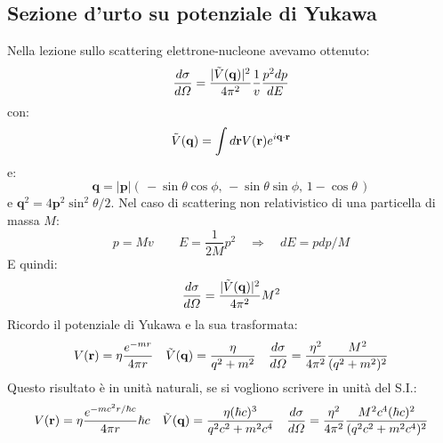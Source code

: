 \subsection{Sezione d'urto su potenziale di Yukawa}
Nella lezione sullo scattering elettrone-nucleone avevamo ottenuto:
\begin{equation*}
    \frac{d\sigma}{d\Omega}=\frac{|\Tilde{V}(\mathbf{q})|^2}{4\pi^2}\frac{1}{v}\frac{p^2dp}{dE}
\end{equation*}
con:
\begin{equation*}
    \Tilde{V}(\mathbf{q})=\int d\mathbf{r}V(\mathbf{r})e^{i\mathbf{q}\cdot\mathbf{r}}
\end{equation*}
e:
\begin{equation*}
    \mathbf{q}=|\mathbf{p}|\left(\,-\sin\theta\cos\phi,\,-\sin\theta\sin\phi,\,1-\cos\theta\,\right)
\end{equation*}
e $\mathbf{q}^2=4\mathbf{p}^2\sin^2{\theta/2}$. Nel caso di scattering non relativistico di una particella di massa $M$:
\begin{equation*}
    p=Mv \qquad E=\frac{1}{2M}p^2 \quad \Rightarrow \quad dE=pdp/M 
\end{equation*}
E quindi:
\begin{equation*}
     \frac{d\sigma}{d\Omega}=\frac{|\Tilde{V}(\mathbf{q})|^2}{4\pi^2}M^2
\end{equation*}
Ricordo il potenziale di Yukawa e la sua trasformata:
\begin{equation*}
    V(\mathbf{r})=\eta\frac{e^{-mr}}{4\pi r} \quad \Tilde{V}(\mathbf{q})=\frac{\eta}{q^2+m^2} \quad  \frac{d\sigma}{d\Omega}=\frac{\eta^2}{4\pi^2}\frac{M^2}{(q^2+m^2)^2}
\end{equation*}
Questo risultato è in unità naturali, se si vogliono scrivere in unità del S.I.:
\begin{equation*}
    V(\mathbf{r})=\eta\frac{e^{-mc^2r/\hbar c}}{4\pi r}\hbar c \quad \Tilde{V}(\mathbf{q})=\frac{\eta(\hbar c)^3}{q^2c^2+m^2c^4} \quad  \frac{d\sigma}{d\Omega}=\frac{\eta^2}{4\pi^2}\frac{M^2c^4(\hbar c)^2}{(q^2c^2+m^2c^4)^2}
\end{equation*}
